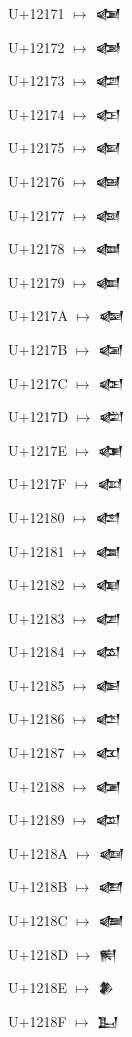{\noindent U+12171  $\mapsto$ {\cufont 𒅱}\par
\noindent U+12172  $\mapsto$ {\cufont 𒅲}\par
\noindent U+12173  $\mapsto$ {\cufont 𒅳}\par
\noindent U+12174  $\mapsto$ {\cufont 𒅴}\par
\noindent U+12175  $\mapsto$ {\cufont 𒅵}\par
\noindent U+12176  $\mapsto$ {\cufont 𒅶}\par
\noindent U+12177  $\mapsto$ {\cufont 𒅷}\par
\noindent U+12178  $\mapsto$ {\cufont 𒅸}\par
\noindent U+12179  $\mapsto$ {\cufont 𒅹}\par
\noindent U+1217A  $\mapsto$ {\cufont 𒅺}\par
\noindent U+1217B  $\mapsto$ {\cufont 𒅻}\par
\noindent U+1217C  $\mapsto$ {\cufont 𒅼}\par
\noindent U+1217D  $\mapsto$ {\cufont 𒅽}\par
\noindent U+1217E  $\mapsto$ {\cufont 𒅾}\par
\noindent U+1217F  $\mapsto$ {\cufont 𒅿}\par
\noindent U+12180  $\mapsto$ {\cufont 𒆀}\par
\noindent U+12181  $\mapsto$ {\cufont 𒆁}\par
\noindent U+12182  $\mapsto$ {\cufont 𒆂}\par
\noindent U+12183  $\mapsto$ {\cufont 𒆃}\par
\noindent U+12184  $\mapsto$ {\cufont 𒆄}\par
\noindent U+12185  $\mapsto$ {\cufont 𒆅}\par
\noindent U+12186  $\mapsto$ {\cufont 𒆆}\par
\noindent U+12187  $\mapsto$ {\cufont 𒆇}\par
\noindent U+12188  $\mapsto$ {\cufont 𒆈}\par
\noindent U+12189  $\mapsto$ {\cufont 𒆉}\par
\noindent U+1218A  $\mapsto$ {\cufont 𒆊}\par
\noindent U+1218B  $\mapsto$ {\cufont 𒆋}\par
\noindent U+1218C  $\mapsto$ {\cufont 𒆌}\par
\noindent U+1218D  $\mapsto$ {\cufont 𒆍}\par
\noindent U+1218E  $\mapsto$ {\cufont 𒆎}\par
\noindent U+1218F  $\mapsto$ {\cufont 𒆏}\par
}
